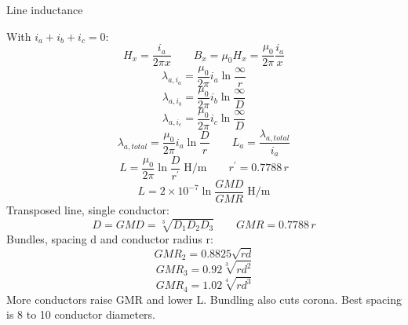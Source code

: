 Line inductance

With $i_a+i_b+i_c=0$:
$$H_x=\frac{i_a}{2\pi x}\qquad B_x=\mu_0H_x=\frac{\mu_0}{2\pi}\frac{i_a}{x}$$
$$\lambda_{a,i_a}=\frac{\mu_0}{2\pi}i_a\ln\frac{\infty}{r}$$
$$\lambda_{a,i_b}=\frac{\mu_0}{2\pi}i_b\ln\frac{\infty}{D}$$
$$\lambda_{a,i_c}=\frac{\mu_0}{2\pi}i_c\ln\frac{\infty}{D}$$
$$\lambda_{a,total}=\frac{\mu_0}{2\pi}i_a\ln\frac{D}{r}\qquad L_a=\frac{\lambda_{a,total}}{i_a}$$
$$L=\frac{\mu_0}{2\pi}\ln\frac{D}{r^{\prime}}\;\text{H/m}\qquad r^{\prime}=0.7788\,r$$
$$L=2\times10^{-7}\ln\frac{GMD}{GMR}\;\text{H/m}$$
Transposed line, single conductor:
$$D=GMD=\sqrt[3]{D_1D_2D_3}\qquad GMR=0.7788\,r$$
Bundles, spacing d and conductor radius r:
$$GMR_2=0.8825\sqrt{rd}$$
$$GMR_3=0.92\sqrt[3]{rd^2}$$
$$GMR_4=1.02\sqrt[4]{rd^3}$$
More conductors raise GMR and lower L. Bundling also cuts corona. Best spacing is 8 to 10 conductor diameters.
